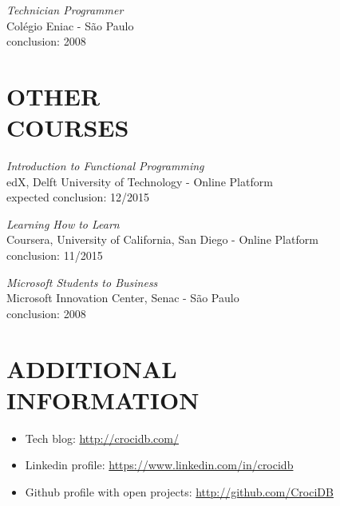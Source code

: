 \documentclass[line,margin]{res}
\begin{document}
\begin{resume}
			{\sl Technician Programmer} \\
	                Colégio Eniac - São Paulo \\
	                conclusion: 2008
                
\section{OTHER \\ COURSES}             
		   {\sl Introduction to Functional Programming} \\
			edX, Delft University of Technology - Online Platform \\
			expected conclusion: 12/2015

		   {\sl Learning How to Learn} \\
			Coursera, University of California, San Diego - Online Platform\\
			conclusion: 11/2015
		
           {\sl Microsoft Students to Business} \\
                Microsoft Innovation Center, Senac - São Paulo \\
                conclusion: 2008 

\section{ADDITIONAL \\ INFORMATION}
            \begin{itemize}  \itemsep 1pt
	    	\item Tech blog: \href{http://crocidb.com/}{http://crocidb.com/}
            \item Linkedin profile: \href{https://www.linkedin.com/in/crocidb}{https://www.linkedin.com/in/crocidb}
            \item Github profile with open projects: \href{http://github.com/CrociDB}{http://github.com/CrociDB}
            \end{itemize} 

\end{resume}
\end{document}
